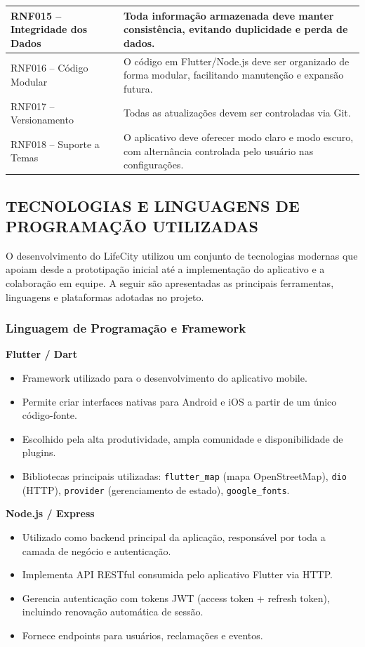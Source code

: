 \begin{longtable}{|p{4cm}|p{10cm}|}
  \hline
  RNF015 – Integridade dos Dados & Toda informação armazenada deve manter consistência, evitando duplicidade e perda de dados. \\
  \hline
  RNF016 – Código Modular & O código em Flutter/Node.js deve ser organizado de forma modular, facilitando manutenção e expansão futura. \\
  \hline
  RNF017 – Versionamento & Todas as atualizações devem ser controladas via Git. \\
  \hline
  RNF018 – Suporte a Temas & O aplicativo deve oferecer modo claro e modo escuro, com alternância controlada pelo usuário nas configurações. \\
  \hline
\end{longtable}

\subsection{TECNOLOGIAS E LINGUAGENS DE PROGRAMAÇÃO UTILIZADAS}

O desenvolvimento do LifeCity utilizou um conjunto de tecnologias modernas que
apoiam desde a prototipação inicial até a implementação do aplicativo e a
colaboração em equipe. A seguir são apresentadas as principais ferramentas,
linguagens e plataformas adotadas no projeto.

\subsubsection{Linguagem de Programação e Framework}

\textbf{Flutter / Dart}
\begin{itemize}
  \item Framework utilizado para o desenvolvimento do aplicativo mobile.
  \item Permite criar interfaces nativas para Android e iOS a partir de um único
        código-fonte.
  \item Escolhido pela alta produtividade, ampla comunidade e disponibilidade de
        plugins.
  \item Bibliotecas principais utilizadas: \texttt{flutter\_map} (mapa
        OpenStreetMap), \texttt{dio} (HTTP), \texttt{provider} (gerenciamento de
        estado), \texttt{google\_fonts}.
\end{itemize}

\textbf{Node.js / Express}
\begin{itemize}
  \item Utilizado como backend principal da aplicação, responsável por toda a
        camada de negócio e autenticação.
  \item Implementa API RESTful consumida pelo aplicativo Flutter via HTTP.
  \item Gerencia autenticação com tokens JWT (access token + refresh token),
        incluindo renovação automática de sessão.
  \item Fornece endpoints para usuários, reclamações e eventos.
\end{itemize}

